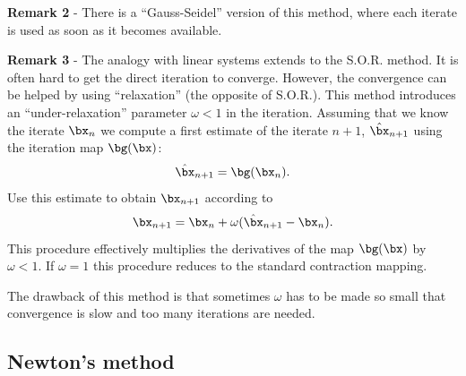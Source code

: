 \noindent
\textbf{Remark 2} - There is a ``Gauss-Seidel'' version of this
method, where each iterate is used as soon as it becomes available.

\noindent
\textbf{Remark 3} - The analogy with linear systems extends to the
S.O.R. method.  It is often hard to get the direct iteration to
converge.  However, the convergence can be helped by using
``relaxation'' (the opposite of S.O.R.).  This method introduces an
``under-relaxation'' parameter $\omega < 1$ in the iteration.
Assuming that we know the iterate $\bx_n$ we compute a first estimate
of the iterate $n+1$, $\hat \bx_{n+1}$ using the iteration map
$\bg(\bx)$:
%
\begin{equation*}
  \hat \bx_{n+1} = \bg(\bx_n) .
\end{equation*}
%
Use this estimate to obtain $\bx_{n+1}$ according to
%
\begin{equation*}
  \bx_{n+1} = \bx_n + \omega ( \hat \bx_{n+1} - \bx_n ) .
\end{equation*}
%
This procedure effectively multiplies the derivatives of the map
$\bg(\bx)$ by $\omega < 1$.  If $\omega = 1$ this procedure reduces to
the standard contraction mapping.

The drawback of this method is that sometimes $\omega$ has to be made
so small that convergence is slow and too many iterations are needed.


\subsection{Newton's method}

